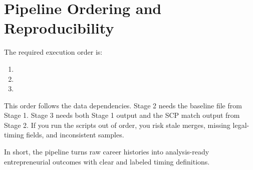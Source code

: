 \documentclass[12pt]{article}
\begin{document}
\section{Pipeline Ordering and Reproducibility}

The required execution order is:
\begin{enumerate}[leftmargin=1.5em]
    \item {}
    \item {}
    \item {}
\end{enumerate}

This order follows the data dependencies. Stage 2 needs the baseline file from Stage 1. Stage 3 needs both Stage 1 output and the SCP match output from Stage 2. If you run the scripts out of order, you risk stale merges, missing legal-timing fields, and inconsistent samples.

In short, the pipeline turns raw career histories into analysis-ready entrepreneurial outcomes with clear and labeled timing definitions.
\end{document}

